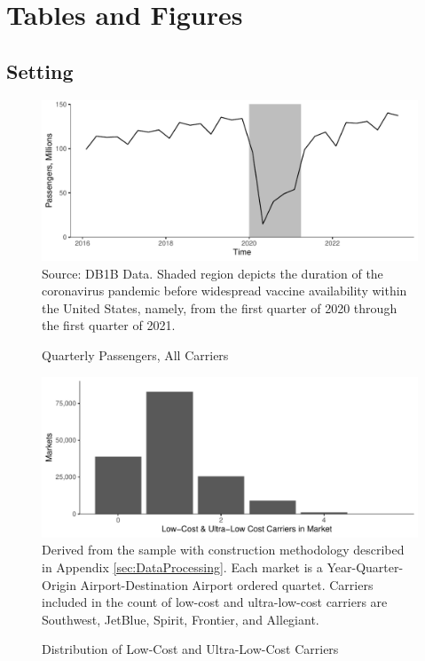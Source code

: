 \documentclass{article}
\begin{document}
\pagebreak 
\FloatBarrier
\section{Tables and Figures}
\subsection{Setting}
\begin{figure}
	\caption{Quarterly Passengers, All Carriers}
	\label{fig:QuarterlyPass}
	\includegraphics[width = \linewidth]{Quarterly_DB1B_Itineraries}
	\footnotesize{Source: DB1B Data. Shaded region depicts the duration of the coronavirus pandemic before widespread vaccine availability within the United States, namely, from the first quarter of 2020 through the first quarter of 2021.}
\end{figure}

\begin{figure}[h]
        \caption{Distribution of Low-Cost and Ultra-Low-Cost Carriers}
        \label{fig:LCC_Distribution}
        \includegraphics[width = \linewidth]{05.Figures/LCC_Market_Graph.pdf}
        \footnotesize{Derived from the sample with construction methodology described in Appendix \ref{sec:DataProcessing}. Each market is a Year-Quarter-Origin Airport-Destination Airport ordered quartet. Carriers included in the count of low-cost and ultra-low-cost carriers are Southwest, JetBlue, Spirit, Frontier, and Allegiant.}
    \end{figure}
\end{document}
